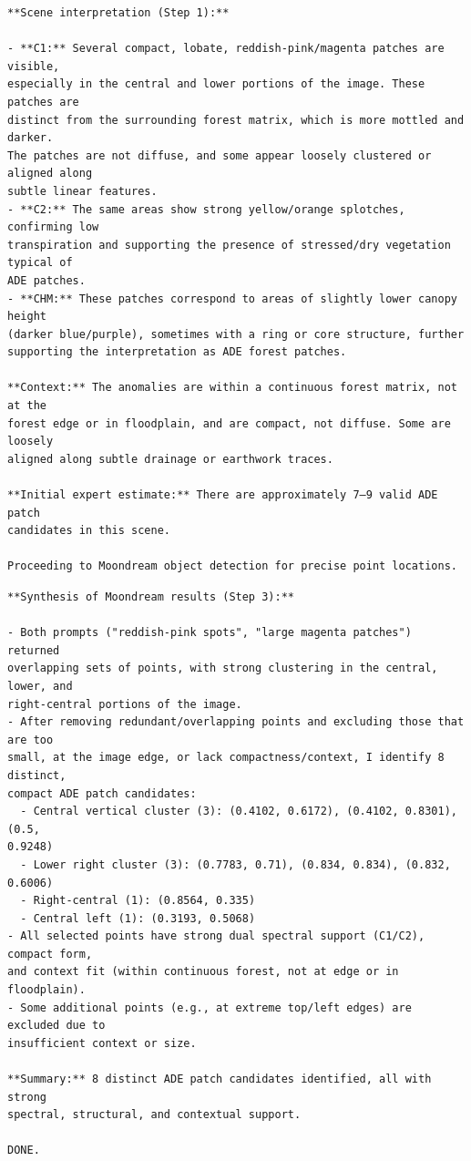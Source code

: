 \documentclass[
  letterpaper,
  DIV=11,
  numbers=noendperiod]{scrartcl}
\begin{document}
\begin{verbatim}
**Scene interpretation (Step 1):**

- **C1:** Several compact, lobate, reddish-pink/magenta patches are visible, 
especially in the central and lower portions of the image. These patches are 
distinct from the surrounding forest matrix, which is more mottled and darker. 
The patches are not diffuse, and some appear loosely clustered or aligned along
subtle linear features.
- **C2:** The same areas show strong yellow/orange splotches, confirming low 
transpiration and supporting the presence of stressed/dry vegetation typical of
ADE patches.
- **CHM:** These patches correspond to areas of slightly lower canopy height 
(darker blue/purple), sometimes with a ring or core structure, further 
supporting the interpretation as ADE forest patches.

**Context:** The anomalies are within a continuous forest matrix, not at the 
forest edge or in floodplain, and are compact, not diffuse. Some are loosely 
aligned along subtle drainage or earthwork traces.

**Initial expert estimate:** There are approximately 7–9 valid ADE patch 
candidates in this scene.

Proceeding to Moondream object detection for precise point locations.
\end{verbatim}

\begin{verbatim}
**Synthesis of Moondream results (Step 3):**

- Both prompts ("reddish-pink spots", "large magenta patches") returned 
overlapping sets of points, with strong clustering in the central, lower, and 
right-central portions of the image.
- After removing redundant/overlapping points and excluding those that are too 
small, at the image edge, or lack compactness/context, I identify 8 distinct, 
compact ADE patch candidates:
  - Central vertical cluster (3): (0.4102, 0.6172), (0.4102, 0.8301), (0.5, 
0.9248)
  - Lower right cluster (3): (0.7783, 0.71), (0.834, 0.834), (0.832, 0.6006)
  - Right-central (1): (0.8564, 0.335)
  - Central left (1): (0.3193, 0.5068)
- All selected points have strong dual spectral support (C1/C2), compact form, 
and context fit (within continuous forest, not at edge or in floodplain).
- Some additional points (e.g., at extreme top/left edges) are excluded due to 
insufficient context or size.

**Summary:** 8 distinct ADE patch candidates identified, all with strong 
spectral, structural, and contextual support.

DONE.
\end{verbatim}
\end{document}
